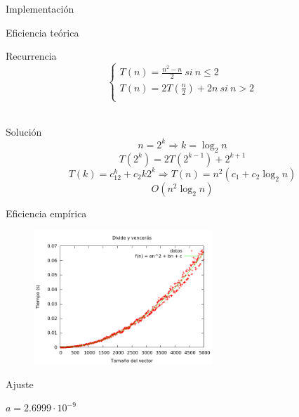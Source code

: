 \begin{frame}{Implementación}

\end{frame}

\begin{frame}{Eficiencia teórica}
\begin{block}{Recurrencia}
$$\left\lbrace
	\begin{array}{l}
	T(n) = \frac{n^2 - n}{2}\  si\ n \leq 2\\
	T(n) = 2T(\frac{n}{2}) + 2n\  si\ n > 2 \\
	\end{array}
	\right.$$\\
\end{block}
\pause

\begin{block}{Solución}
$$n=2^k \Rightarrow k = \log_2n$$
$$T(2^k) = 2T(2^{k-1}) + 2^{k+1}$$
$$T(k)=c_12^k+c_2k2^k \Rightarrow T(n) = n^2(c_1+c_2\log_2n)$$
$$O(n^2\log_2n)$$
\end{block}
\end{frame}

\begin{frame}{Eficiencia empírica}
\begin{figure}[h]
	\centering
		\includegraphics[width=0.6\textwidth]{../Opcional/Graficas/dyv_bruno.png}
\end{figure}

\begin{block}{Ajuste}
\begin{center}
$a = 2.6999 \cdot 10^{-9}$
\end{center}
\end{block}
\end{frame}


